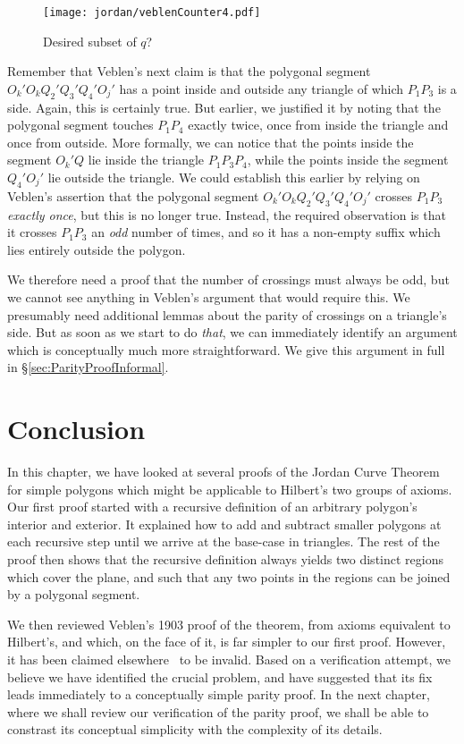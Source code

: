 \begin{figure}
\centering
\texttt{[image: jordan/veblenCounter4.pdf]}
\caption{Desired subset of $q$?}
\label{fig:VeblenCounter4}
\end{figure}

Remember that Veblen's next claim is that the polygonal segment $O_k'O_kQ_2'Q_3'Q_4'O_j'$ has a point inside and outside any triangle of which $P_1P_3$ is a side. Again, this is certainly true. But earlier, we justified it by noting that the polygonal segment touches $P_1P_4$ exactly twice, once from inside the triangle and once from outside. More formally, we can notice that the points inside the segment $O_k'Q$ lie inside the triangle $P_1P_3P_4$, while the points inside the segment $Q_4'O_j'$ lie outside the triangle. We could establish this earlier by relying on Veblen's assertion that the polygonal segment $O_k'O_kQ_2'Q_3'Q_4'O_j'$ crosses $P_1P_3$ \emph{exactly once}, but this is no longer true. Instead, the required observation is that it crosses $P_1P_3$ an \emph{odd} number of times, and so it has a non-empty suffix which lies entirely outside the polygon. 

We therefore need a proof that the number of crossings must always be odd, but we cannot see anything in Veblen's argument that would require this. We presumably need additional lemmas about the parity of crossings on a triangle's side. But as soon as we start to do \emph{that}, we can immediately identify an argument which is conceptually much more straightforward. We give this argument in full in \S\ref{sec:ParityProofInformal}.

\section{Conclusion}
In this chapter, we have looked at several proofs of the Jordan Curve Theorem for simple polygons which might be applicable to Hilbert's two groups of axioms. Our first proof started with a recursive definition of an arbitrary polygon's interior and exterior. It explained how to add and subtract smaller polygons at each recursive step until we arrive at the base-case in triangles. The rest of the proof then shows that the recursive definition always yields two distinct regions which cover the plane, and such that any two points in the regions can be joined by a polygonal segment.

We then reviewed Veblen's 1903 proof of the theorem, from axioms equivalent to Hilbert's, and which, on the face of it, is far simpler to our first proof. However, it has been claimed elsewhere~\cite{GuggenheimerJordanCurve,HahnInconclusiveIndirect} to be invalid. Based on a verification attempt, we believe we have identified the crucial problem, and have suggested that its fix leads immediately to a conceptually simple parity proof. In the next chapter, where we shall review our verification of the parity proof, we shall be able to constrast its conceptual simplicity with the complexity of its details.

